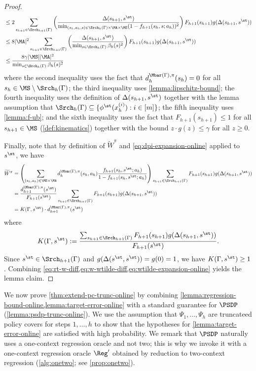 \begin{proof}
\begin{align}
&\leq 2\sum_{s_{h+1}\in\Srch_{h+1}(\Gamma)} \left(\frac{\Delta(s_{h+1},s^\st)}{\min_{(s_h,a_h,s) \in \Srch_h(\Gamma)\times\MA\times\MS} (1-f_{h+1}(s_h,s;a_h))^2}\right) F_{h+1}(s_{h+1}) g(\Delta(s_{h+1},s^\st)) \nonumber\\
&\leq 8|\MA|^2\sum_{s_{h+1}\in\Srch_{h+1}(\Gamma)} \left(\frac{\Delta(s_{h+1},s^\st)}{\min_{s \in \Srch_h(\Gamma)} \beta_h(s)^2}\right) F_{h+1}(s_{h+1}) g(\Delta(s_{h+1},s^\st)) \nonumber\\
&\leq \frac{8\gamma |\MS| |\MA|^2}{\min_{s \in \Srch_h(\Gamma)} \beta_h(s)^2}
\label{eq:w-wtilde-diff}
\end{align}
where the second inequality uses the fact that $d^{\Mbar(\Gamma),\pi}_h(s_h) = 0$ for all $s_h \in \MS \setminus \Srch_h(\Gamma)$; the third inequality uses \cref{lemma:lipschitz-bound}; the fourth inequality uses the definition of $\Delta(s_{h+1},s^\st)$ together with the lemma assumption that $\Srch_h(\Gamma) \subseteq \{\phi^\st(x^{(i)}_h):i\in[m]\}$; the fifth inequality uses \cref{lemma:f-ub}; and the sixth inequality uses the fact that $F_{h+1}(s_{h+1}) \leq 1$ for all $s_{h+1} \in \MS$ (\cref{def:kinematics}) together with the bound $z \cdot g(z) \leq \gamma$ for all $z \geq 0$. 

Finally, note that by definition of $\widetilde W^\pi$ and \cref{eq:dpi-expansion-online} applied to $s^\st$, we have
\begin{align}
\widetilde W^\pi 
&=  \left(\sum_{(s_h,a_h)\in\MS\times\MA} d^{\Mbar(\Gamma),\pi}_h(s_h,a_h) \frac{f_{h+1}(s_h,s^\st;a_h)}{1-f_{h+1}(s_h,s^\st;a_h)}\right) \sum_{s_{h+1}\in\Srch_{h+1}(\Gamma)} F_{h+1}(s_{h+1}) g(\Delta(s_{h+1},s^\st)) \nonumber \\ 
&= \frac{d^{\Mbar(\Gamma),\pi}_{h+1}(s^\st)}{ F_{h+1}(s^\st)} \sum_{s_{h+1}\in\Srch_{h+1}(\Gamma)} F_{h+1}(s_{h+1})g(\Delta(s_{h+1},s^\st)) \nonumber \\ 
&= K(\Gamma,s^\st) \cdot d^{\Mbar(\Gamma),\pi}_{h+1}(s^\st) \label{eq:wtilde-expansion-online}
\end{align}
where \[K(\Gamma,s^\st) := \frac{\sum_{s_{h+1}\in\Srch_{h+1}(\Gamma)}  F_{h+1}(s_{h+1})g(\Delta(s_{h+1},s^\st))}{F_{h+1}(s^\st)}.\]
Since $s^\st \in \Srch_{h+1}(\Gamma)$ and $g(\Delta(s^\st,s^\st)) = g(0) = 1$, we have $K(\Gamma,s^\st) \geq 1$. Combining \cref{eq:rt-w-diff,eq:w-wtilde-diff,eq:wtilde-expansion-online} yields the lemma claim.
\end{proof}



We now prove \cref{thm:extend-pc-trunc-online} by combining \cref{lemma:regression-bound-online,lemma:target-error-online} with a standard guarantee for $\PSDP$ (\cref{lemma:psdp-trunc-online}). We use the assumption that $\Psi_1,\dots,\Psi_h$ are truncateed policy covers for steps $1,\dots,h$ to show that the hypotheses for \cref{lemma:target-error-online} are satisfied with high probability. We remark that $\PSDP$ naturally uses a one-context regression oracle and not two; this is why we invoke it with a one-context regression oracle $\Reg'$ obtained by reduction to two-context regression (\cref{alg:onetwo}; see \cref{prop:onetwo}).

